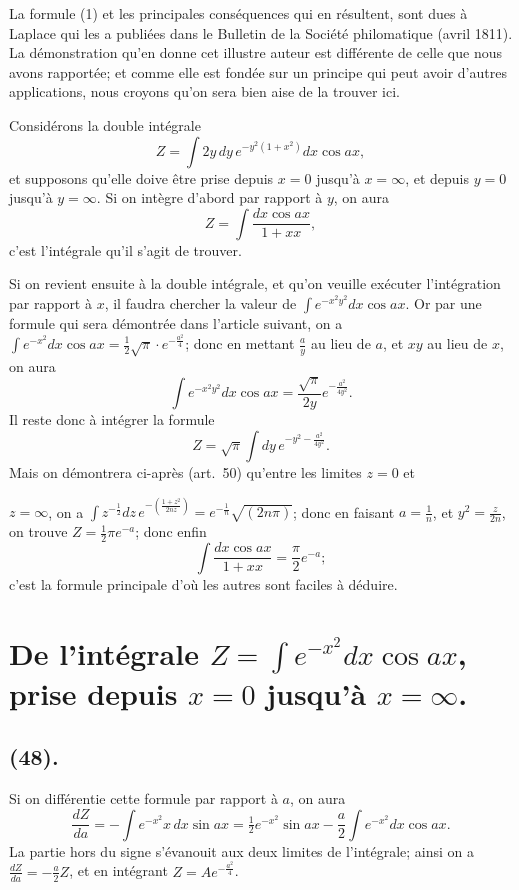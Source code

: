 \documentclass{article}
\begin{document}
La formule (1) et les principales conséquences qui en résultent, sont dues à Laplace qui les a publiées dans le Bulletin de la Société philomatique (avril 1811). La démonstration qu'en donne cet illustre auteur est différente de celle que nous avons rapportée; et comme elle est fondée sur un principe qui peut avoir d'autres applications, nous croyons qu'on sera bien aise de la trouver ici.

Considérons la double intégrale
\[ Z=\int2y\,dy\,e^{-y^{2}(1+x^{2})}dx\cos ax, \]
et supposons qu'elle doive être prise depuis $x=0$ jusqu'à $x=\infty$, et depuis $y=0$ jusqu'à $y=\infty$. Si on intègre d'abord par rapport à $y$, on aura
\[ Z=\int\frac{dx\cos ax}{1+xx}, \]
c'est l'intégrale qu'il s'agit de trouver.

Si on revient ensuite à la double intégrale, et qu'on veuille exécuter l'intégration par rapport à $x$, il faudra chercher la valeur de $\displaystyle\int e^{-x^{2}y^{2}}dx\cos ax$. Or par une formule qui sera démontrée dans l'article suivant, on a $\displaystyle\int e^{-x^{2}}dx\cos ax=\tfrac{1}{2}\sqrt{\pi}\cdot e^{-\frac{a^{2}}{4}}$; donc en mettant $\frac{a}{y}$ au lieu de $a$, et $xy$ au lieu de $x$, on aura
\[ \int e^{-x^{2}y^{2}}dx\cos ax=\frac{\sqrt{\pi}}{2y}e^{-\frac{a^{2}}{4y^{2}}}. \]
Il reste donc à intégrer la formule
\[ Z=\sqrt{\pi}\int dy\,e^{-y^{2}-\frac{a^{2}}{4y^{2}}}. \]
Mais on démontrera ci-après (art.\ 50) qu'entre les limites $z=0$ et

$z=\infty$, on a $\displaystyle\int z^{-\frac{1}{2}}dz\,e^{-\left(\frac{1+z^{2}}{2nz}\right)}=e^{-\frac{1}{n}}\sqrt{(2n\pi)}$; donc en faisant $a=\frac{1}{n}$, et $y^{2}=\frac{z}{2n}$, on trouve $Z=\frac{1}{2}\pi e^{-a}$; donc enfin
\[ \int\frac{dx\cos ax}{1+xx}=\frac{\pi}{2}e^{-a}; \]
c'est la formule principale d'où les autres sont faciles à déduire.

\section*{De l'intégrale $\displaystyle Z=\int e^{-x^{2}}dx\cos ax$, prise depuis $x=0$ jusqu'à $x=\infty$.}

\subsection*{(48).}

Si on différentie cette formule par rapport à $a$, on aura
\[ \frac{dZ}{da}=-\int e^{-x^{2}}x\,dx\sin ax=\tfrac{1}{2}e^{-x^{2}}\sin ax-\frac{a}{2}\int e^{-x^{2}}dx\cos ax. \]
La partie hors du signe s'évanouit aux deux limites de l'intégrale; ainsi on a $\frac{dZ}{da}=-\frac{a}{2}Z$, et en intégrant $Z=Ae^{-\frac{a^{2}}{4}}$.
\end{document}
